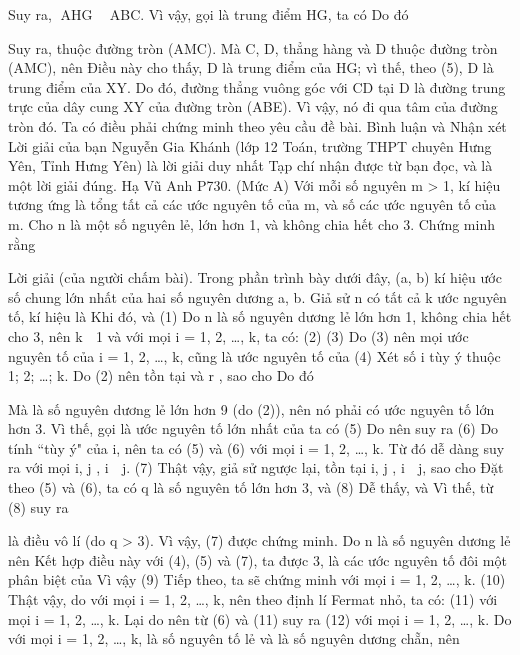 \begin{multicols}{2}
{	Suy ra, AHG  ABC.
	Vì vậy, gọi   là trung điểm HG, ta có   Do đó
	
	Suy ra,   thuộc đường tròn (AMC). Mà C, D,   thẳng hàng và D thuộc đường tròn (AMC), nên   Điều này cho thấy, D là trung điểm của HG; vì thế, theo (5), D là trung điểm của XY. Do đó, đường thẳng vuông góc với CD tại D là đường trung trực của dây cung XY của đường tròn (ABE). Vì vậy, nó đi qua tâm của đường tròn đó. Ta có điều phải chứng minh theo yêu cầu đề bài.
	Bình luận và Nhận xét
	Lời giải của bạn Nguyễn Gia Khánh (lớp 12 Toán, trường THPT chuyên Hưng Yên, Tỉnh Hưng Yên) là lời giải duy nhất Tạp chí nhận được từ bạn đọc, và là một lời giải đúng.
	Hạ Vũ Anh
	P730. (Mức A) Với mỗi số nguyên m > 1, kí hiệu   tương ứng là tổng tất cả các ước nguyên tố của m, và số các ước nguyên tố của m. Cho n là một số nguyên lẻ, lớn hơn 1, và không chia hết cho 3. Chứng minh rằng
	
	Lời giải (của người chấm bài).
	Trong phần trình bày dưới đây, (a, b) kí hiệu ước số chung lớn nhất của hai số nguyên dương a, b.
	Giả sử n có tất cả k ước nguyên tố, kí hiệu là  
	Khi đó,   và                                                                                    (1)
	Do n là số nguyên dương lẻ lớn hơn 1, không chia hết cho 3, nên k  1 và với mọi i = 1, 2, …, k, ta có:
	(2)
	(3)
	Do (3) nên mọi ước nguyên tố của   i = 1, 2, …, k, cũng là ước nguyên tố của               (4)
	Xét số i tùy ý thuộc {1; 2; …; k}.
	Do (2) nên tồn tại   và r , sao cho   Do đó
	
	Mà   là số nguyên dương lẻ lớn hơn 9 (do (2)), nên nó phải có ước nguyên tố lớn hơn 3. Vì thế, gọi   là ước nguyên tố lớn nhất của   ta có                                                                      (5)     
	Do   nên   suy ra
	(6)
	Do tính ``tùy ý" của i, nên ta có (5) và (6) với mọi i = 1, 2, …, k.
	Từ đó dễ dàng suy ra
	với mọi i, j , i  j.                                              (7)
	Thật vậy, giả sử ngược lại, tồn tại i, j , i  j, sao cho  
	Đặt   theo (5) và (6), ta có q là số nguyên tố lớn hơn 3, và
	(8)
	Dễ thấy,   và   Vì thế, từ (8) suy ra
	
	là điều vô lí (do q > 3). Vì vậy, (7) được chứng minh.
	Do n là số nguyên dương lẻ nên   Kết hợp điều này với (4), (5) và (7), ta được 3,   là các ước nguyên tố đôi một phân biệt của   Vì vậy
	(9)
	Tiếp theo, ta sẽ chứng minh
	với mọi i = 1, 2, …, k.                                                (10)
	Thật vậy, do   với mọi i = 1, 2, …, k, nên theo định lí Fermat nhỏ, ta có:
	(11)
	với mọi i = 1, 2, …, k.
	Lại do   nên từ (6) và (11) suy ra
	(12)
	với mọi i = 1, 2, …, k.
	Do với mọi i = 1, 2, …, k,   là số nguyên tố lẻ và   là số nguyên dương chẵn, nên
	
}
\end{multicols}
